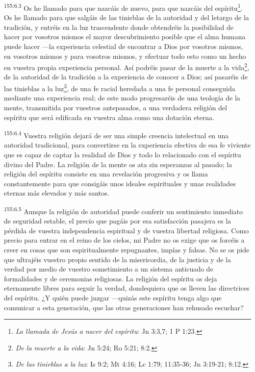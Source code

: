 \par
\textsuperscript{155:6.3} Os he llamado para que nazcáis de nuevo, para que nazcáis del espíritu\footnote{\textit{La llamada de Jesús a nacer del espíritu}: Jn 3:3,7; 1 P 1:23.}. Os he llamado para que salgáis de las tinieblas de la autoridad y del letargo de la tradición, y entréis en la luz trascendente donde obtendréis la posibilidad de hacer por vosotros mismos el mayor descubrimiento posible que el alma humana puede hacer ---la experiencia celestial de encontrar a Dios por vosotros mismos, en vosotros mismos y para vosotros mismos, y efectuar todo esto como un hecho en vuestra propia experiencia personal. Así podréis pasar de la muerte a la vida\footnote{\textit{De la muerte a la vida}: Jn 5:24; Ro 5:21; 8:2.}, de la autoridad de la tradición a la experiencia de conocer a Dios; así pasaréis de las tinieblas a la luz\footnote{\textit{De las tinieblas a la luz}: Is 9:2; Mt 4:16; Lc 1:79; 11:35-36; Jn 3:19-21; 8:12.}, de una fe racial heredada a una fe personal conseguida mediante una experiencia real; de este modo progresaréis de una teología de la mente, transmitida por vuestros antepasados, a una verdadera religión del espíritu que será edificada en vuestra alma como una dotación eterna.

\par
\textsuperscript{155:6.4} Vuestra religión dejará de ser una simple creencia intelectual en una autoridad tradicional, para convertirse en la experiencia efectiva de esa fe viviente que es capaz de captar la realidad de Dios y todo lo relacionado con el espíritu divino del Padre. La religión de la mente os ata sin esperanzas al pasado; la religión del espíritu consiste en una revelación progresiva y os llama constantemente para que consigáis unos ideales espirituales y unas realidades eternas más elevados y más santos.

\par
\textsuperscript{155:6.5} Aunque la religión de autoridad puede conferir un sentimiento inmediato de seguridad estable, el precio que pagáis por esa satisfacción pasajera es la pérdida de vuestra independencia espiritual y de vuestra libertad religiosa. Como precio para entrar en el reino de los cielos, mi Padre no os exige que os forcéis a creer en cosas que son espiritualmente repugnantes, impías y falsas. No se os pide que ultrajéis vuestro propio sentido de la misericordia, de la justicia y de la verdad por medio de vuestro sometimiento a un sistema anticuado de formalidades y de ceremonias religiosas. La religión del espíritu os deja eternamente libres para seguir la verdad, dondequiera que os lleven las directrices del espíritu. ¿Y quién puede juzgar ---quizás este espíritu tenga algo que comunicar a esta generación, que las otras generaciones han rehusado escuchar?

